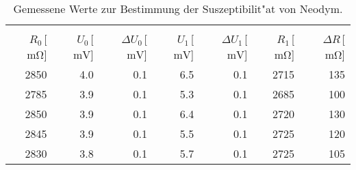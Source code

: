 \begin{table}[!h]

\begin{center}
\begin{tabular}{|r|r|r|r|r|r|r|}
\hline
&&&&&&\\
$R_\mathrm{0}$\,[$\SI{}{\milli\ohm}$] & $U_\mathrm{0}$\,[$\SI{}{\milli\volt}$] & $\Delta U_\mathrm{0}$\,[$\SI{}{\milli\volt}$] & $U_\mathrm{1}$\,[$\SI{}{\milli\volt}$] & $\Delta U_\mathrm{1}$\,[$\SI{}{\milli\volt}$] & $R_\mathrm{1}$\,[$\SI{}{\milli\ohm}$] & $\Delta R$\,[$\SI{}{\milli\ohm}$]\\
\hline
\hline

2850 & 4.0 & 0.1 & 6.5 & 0.1 & 2715 & 135\\
2785 & 3.9 & 0.1 & 5.3 & 0.1 & 2685 & 100\\
2850 & 3.9 & 0.1 & 6.4 & 0.1 & 2720 & 130\\
2845 & 3.9 & 0.1 & 5.5 & 0.1 & 2725 & 120\\
2830 & 3.8 & 0.1 & 5.7 & 0.1 & 2725 & 105\\

\hline
\end{tabular}
\caption[Messwerte zu Aufgabenteil b]{Gemessene Werte zur Bestimmung der Suszeptibilit"at von Neodym.}
\label{tabelle:aufgabe_b_Nd}
\end{center}
\end{table}